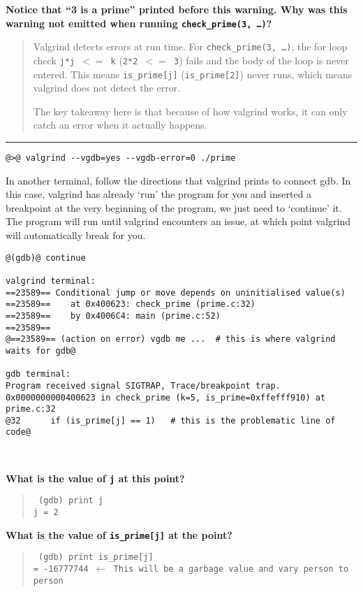 \documentclass{article}
\begin{document}
\textbf{Notice that ``3 is a prime'' printed before this warning. Why was this
  warning not emitted when running \texttt{check\_prime(3,~\dots)}?}
\begin{quote}
  \color{violet}
  Valgrind detects errors at run time. For \texttt{check\_prime(3,~\dots)},
  the for loop check \texttt{j*j~$<=$~k} (\texttt{2*2~$<=$~3}) fails and
  the body of the loop is never entered. This means \texttt{is\_prime[j]}
  (\texttt{is\_prime[2]}) never runs, which means valgrind does not detect
  the error.

  The key takeaway here is that because of how valgrind works, it can only
  catch an error when it actually happens.
\end{quote}

\hrule
\begin{lstlisting}
@>@ valgrind --vgdb=yes --vgdb-error=0 ./prime
\end{lstlisting}
In another terminal, follow the directions that valgrind prints to connect
gdb. In this case, valgrind has already `run' the program for you and inserted
a breakpoint at the very beginning of the program, we just need to `continue'
it. The program will run until valgrind encounters an issue, at which point
valgrind will automatically break for you.
\begin{lstlisting}
@(gdb)@ continue

valgrind terminal:
==23589== Conditional jump or move depends on uninitialised value(s)
==23589==    at 0x400623: check_prime (prime.c:32)
==23589==    by 0x4006C4: main (prime.c:52)
==23589== 
@==23589== (action on error) vgdb me ...  # this is where valgrind waits for gdb@

gdb terminal:
Program received signal SIGTRAP, Trace/breakpoint trap.
0x0000000000400623 in check_prime (k=5, is_prime=0xffefff910) at prime.c:32
@32      if (is_prime[j] == 1)   # this is the problematic line of code@
\end{lstlisting}

~

\textbf{What is the value of \texttt{j} at this point?}
\begin{quote}
  \color{violet}\tt
  (gdb) print j\\
  j = 2
\end{quote}

\textbf{What is the value of \texttt{is\_prime[j]} at the point?}
\begin{quote}
  \color{blue}\tt
  (gdb) print is\_prime[j]\\
  = -16777744 $\leftarrow$ This will be a garbage value and vary person to person
\end{quote}
\end{document}
